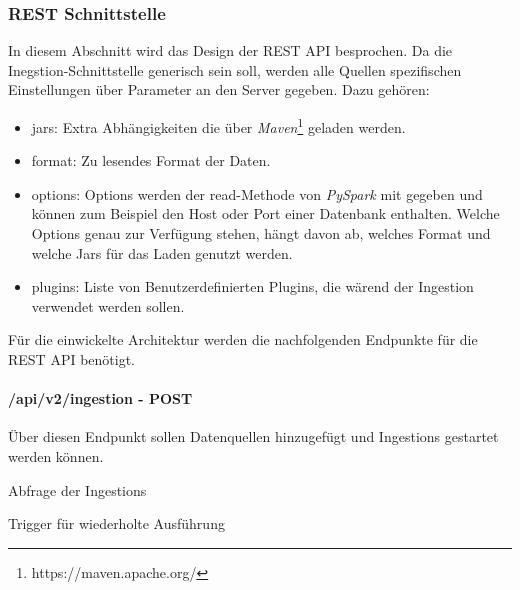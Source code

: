 \subsubsection{REST Schnittstelle}
In diesem Abschnitt wird das Design der REST API besprochen.
Da die Inegstion-Schnittstelle generisch sein soll, werden alle Quellen spezifischen Einstellungen über Parameter an den Server gegeben.
Dazu gehören: 
\begin{itemize}
    \item jars: Extra Abhängigkeiten die über \textit{Maven}\footnote{https://maven.apache.org/} geladen werden.
    \item format: Zu lesendes Format der Daten.
    \item options: Options werden der read-Methode von \textit{PySpark} mit gegeben und können zum Beispiel den Host oder Port einer Datenbank enthalten.
    Welche Options genau zur Verfügung stehen, hängt davon ab, welches Format und welche Jars für das Laden genutzt werden.
    \item plugins: Liste von Benutzerdefinierten Plugins, die wärend der Ingestion verwendet werden sollen.
\end{itemize}

Für die einwickelte Architektur werden die nachfolgenden Endpunkte für die REST API benötigt.
\paragraph{/api/v2/ingestion - POST}
Über diesen Endpunkt sollen Datenquellen hinzugefügt und Ingestions gestartet werden können.

\begin{description}
    \item[/api/v2/ingestion] 
    \item Abfrage der Ingestions
    \item Trigger für wiederholte Ausführung
\end{description}